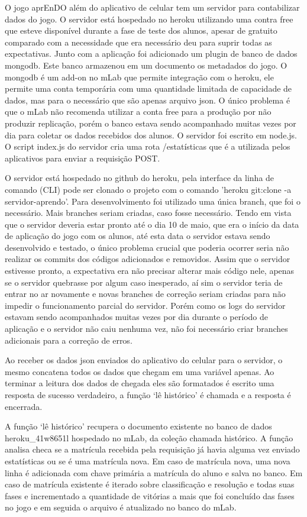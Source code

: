 O jogo aprEnDO além do aplicativo de celular tem um servidor para contabilizar dados do jogo.
O servidor está hospedado no heroku utilizando uma contra free que esteve disponível durante a fase de teste dos alunos, apesar de gratuito comparado com a necessidade que era necessário deu para suprir todas as expectativas. Junto com a aplicação foi adicionado um plugin de banco de dados mongodb. Este banco armazenou em um documento os metadados do jogo. O mongodb é um add-on no mLab que permite integração com o heroku, ele permite uma conta temporária com uma quantidade limitada de capacidade de dados, mas para o necessário que são apenas arquivo json. O único problema é que  o mLab não recomenda utilizar a conta free para a produção por não produzir replicação, porém o banco estava sendo acompanhado muitas vezes por dia para coletar os dados recebidos dos alunos. 
O servidor foi escrito em node.js. O script index.js do servidor cria uma rota /estatísticas que é a utilizada pelos aplicativos para enviar a requisição POST. 

O servidor está hospedado no github do heroku, pela interface da linha de comando (CLI) pode ser clonado o projeto com o comando 'heroku git:clone -a servidor-aprendo'.
Para desenvolvimento foi utilizado uma única branch, que foi o necessário. Mais branches seriam criadas, caso fosse necessário. Tendo em vista que o servidor deveria estar pronto até o dia 10 de maio, que era o início da data de aplicação do jogo com os alunos, até esta data o servidor estava sendo desenvolvido e testado, o único problema crucial que poderia ocorrer seria não realizar os commits dos códigos adicionados e removidos. Assim que o servidor estivesse pronto, a expectativa era não precisar alterar mais código nele, apenas se o servidor quebrasse por algum caso inesperado, aí sim o servidor teria de entrar no ar novamente e novas branches de correção seriam criadas para não impedir o funcionamento parcial do servidor. Porém como os logs do servidor estavam sendo acompanhados muitas vezes por dia durante o período de aplicação e o servidor não caiu nenhuma vez, não foi necessário criar branches adicionais para a correção de erros. 

Ao receber os dados json enviados do aplicativo do celular para o servidor, o mesmo concatena todos os dados que chegam em uma variável apenas. Ao terminar a leitura dos dados de chegada eles são formatados é escrito uma resposta de sucesso verdadeiro, a função ‘lê histórico’ é chamada e a resposta é encerrada.

A função ‘lê histórico’ recupera o documento existente no banco de dados heroku\_41w8651l hospedado no mLab, da coleção chamada histórico. A função analisa checa se a matrícula recebida pela requisição já havia alguma vez enviado estatísticas ou se é uma matrícula nova. Em caso de matrícula nova, uma nova linha é adicionada com chave primária a matrícula do aluno e salva no banco. Em caso de matrícula existente é iterado sobre classificação e resolução e todas suas fases e incrementado a quantidade de vitórias a mais que foi concluído das fases no jogo e em seguida o arquivo é atualizado no banco do mLab.

